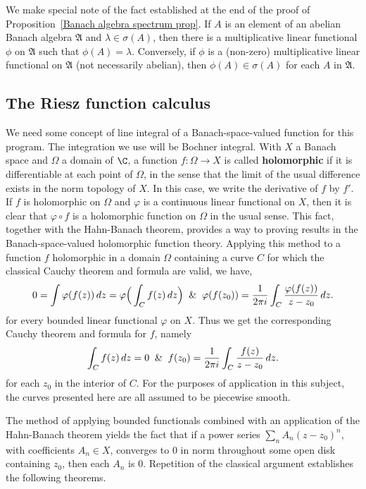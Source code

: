 \begin{remark}
We make special note of the fact established at the end of the proof of Proposition~\ref{Banach algebra spectrum prop}. If $A$ is an element of an abelian Banach algebra $\mathfrak{A}$ and $\lambda\in\sigma(A)$, then there is a multiplicative linear functional $\phi$ on $\mathfrak{A}$ such that $\phi(A)=\lambda$. Conversely, if $\phi$ is a (non-zero) multiplicative linear functional on $\mathfrak{A}$ (not necessarily abelian), then $\phi(A)\in\sigma(A)$ for each $A$ in $\mathfrak{A}$.
\end{remark}
\subsection{The Riesz function calculus}
We need some concept of line integral of a Banach-space-valued function for this program. The integration we use will be Bochner integral. With $X$ a Banach space and $\Omega$ a domain of $\C$, a function $f:\Omega\to X$ is called \textbf{holomorphic} if it is differentiable at each point of $\Omega$, in the sense that the limit of the usual difference exists in the norm topology of $X$. In this case, we write the derivative of $f$ by $f'$. If $f$ is holomorphic on $\Omega$ and $\varphi$ is a continuous linear functional on $X$, then it is clear that $\varphi\circ f$ is a holomorphic function on $\Omega$ in the usual sense. This fact, together with the Hahn-Banach theorem, provides a way to proving results in the Banach-space-valued holomorphic function theory. Applying this method to a function $f$ holomorphic in a domain $\Omega$ containing a curve $C$ for which the classical Cauchy theorem and formula are valid, we have,
\[0=\int\varphi(f(z))\,dz=\varphi\Big(\int_C f(z)\,dz\Big)\And\varphi(f(z_0))=\frac{1}{2\pi i}\int_C\frac{\varphi(f(z))}{z-z_0}\,dz.\]
for every bounded linear functional $\varphi$ on $X$. Thus we get the corresponding Cauchy theorem and formula for $f$, namely
\[\int_Cf(z)\,dz=0\And f(z_0)=\frac{1}{2\pi i}\int_C\frac{f(z)}{z-z_0}\,dz.\]
for each $z_0$ in the interior of $C$. For the purposes of application in this subject, the curves presented here are all assumed to be piecewise smooth.\par
The method of applying bounded functionals combined with an application of the Hahn-Banach theorem yields the fact that if a power series $\sum_nA_n(z-z_0)^n$, with coefficients $A_n\in X$, converges to $0$ in norm throughout some open disk containing $z_0$, then each $A_n$ is $0$. Repetition of the classical argument establishes the following theorems.
